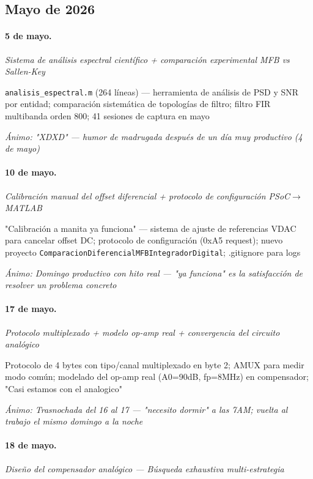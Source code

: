 \subsection{Mayo de 2026}
\paragraph{5 de mayo.}
\emph{Sistema de análisis espectral científico + comparación experimental MFB vs Sallen-Key}

\texttt{analisis\_espectral.m} (264 líneas) --- herramienta de análisis de PSD y SNR por entidad; comparación sistemática de topologías de filtro; filtro FIR multibanda orden 800; 41 sesiones de captura en mayo

{\footnotesize\itshape \'Animo: "XDXD" --- humor de madrugada después de un día muy productivo (4 de mayo)}

\paragraph{10 de mayo.}
\emph{Calibración manual del offset diferencial + protocolo de configuración PSoC$\rightarrow$MATLAB}

"Calibración a manita ya funciona" --- sistema de ajuste de referencias VDAC para cancelar offset DC; protocolo de configuración (0xA5 request); nuevo proyecto \texttt{ComparacionDiferencialMFBIntegradorDigital}; .gitignore para logs

{\footnotesize\itshape \'Animo: Domingo productivo con hito real --- "ya funciona" es la satisfacción de resolver un problema concreto}

\paragraph{17 de mayo.}
\emph{Protocolo multiplexado + modelo op-amp real + convergencia del circuito analógico}

Protocolo de 4 bytes con tipo/canal multiplexado en byte 2; AMUX para medir modo común; modelado del op-amp real (A0=90dB, fp=8MHz) en compensador; "Casi estamos con el analogico"

{\footnotesize\itshape \'Animo: Trasnochada del 16 al 17 --- "necesito dormir" a las 7AM; vuelta al trabajo el mismo domingo a la noche}

\paragraph{18 de mayo.}
\emph{Diseño del compensador analógico --- Búsqueda exhaustiva multi-estrategia}

